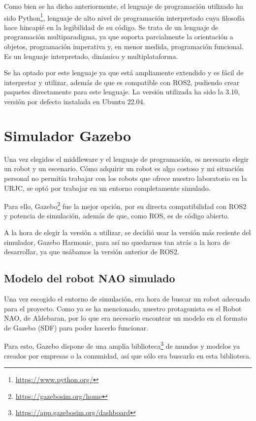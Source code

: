 Como bien se ha dicho anteriormente, el lenguaje de programación utilizado ha sido Python\footnote{\url{https://www.python.org/}}, lenguaje de alto nivel de programación interpretado cuya filosofía hace hincapié en la legibilidad de su código. Se trata de un lenguaje de programación multiparadigma, ya que soporta parcialmente la orientación a objetos, programación imperativa y, en menor medida, programación funcional. Es un lenguaje interpretado, dinámico y multiplataforma.

Se ha optado por este lenguaje ya que está ampliamente extendido y es fácil de interpretar y utilizar, además de que es compatible con ROS2, pudiendo crear paquetes directamente para este lenguaje. La versión utilizada ha sido la 3.10, versión por defecto instalada en Ubuntu 22.04.

\section{Simulador Gazebo}

Una vez elegidos el middleware y el lenguaje de programación, es necesario elegir un robot y un escenario. Cómo adquirir un robot es algo costoso y mi situación personal no permitía trabajar con los robots que ofrece nuestro laboratorio en la URJC, se optó por trabajar en un entorno completamente simulado.

Para ello, Gazebo\footnote{\url{https://gazebosim.org/home}} fue la mejor opción, por su directa compatibilidad con ROS2 y potencia de simulación, además de que, como ROS, es de código abierto.

A la hora de elegir la versión a utilizar, se decidió usar la versión más reciente del simulador, Gazebo Harmonic, para así no quedarnos tan atrás a la hora de desarrollar, ya que usábamos la versión anterior de ROS2.

\subsection{Modelo del robot NAO simulado}

Una vez escogido el entorno de simulación, era hora de buscar un robot adecuado para el proyecto. Como ya se ha mencionado, nuestro protagonista es el Robot NAO, de Aldebaran, por lo que era necesario encontrar un modelo en el formato de Gazebo (SDF) para poder hacerlo funcionar.

Para esto, Gazebo dispone de una amplia biblioteca\footnote{\url{https://app.gazebosim.org/dashboard}} de mundos y modelos ya creados por empresas o la comunidad, así que sólo era buscarlo en esta biblioteca.

